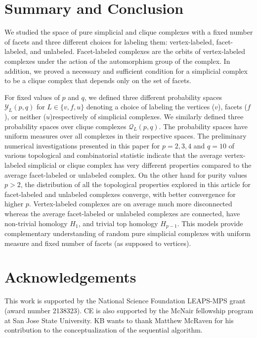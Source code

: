 \documentclass[12pt]{article}
\theoremstyle{plain}
\theoremstyle{definition}
\theoremstyle{remark}
\begin{document}

\section{Summary and Conclusion}
\label{sec:conclusion}
We studied the space of pure simplicial and clique complexes with a fixed number of facets and three different choices for labeling them: vertex-labeled, facet-labeled, and unlabeled. Facet-labeled complexes are the orbits of vertex-labeled complexes under the action of the automorphism group of the complex. In addition, we proved a necessary and sufficient condition for a simplicial complex to be a clique complex that depends only on the set of facets. 

For fixed values of $p$ and $q$, we  defined three different probability spaces $\mathcal{Y}_L(p,q)$ for $L\in\{v,f,u\}$ denoting a choice of labeling the vertices ($v$), facets ($f$), or neither ($u$)respectively of simplicial complexes. We similarly defined three probability spaces over clique complexes $\mathcal{Q}_L(p,q)$. The probability spaces have uniform measures over all complexes in their respective spaces. The preliminary numerical investigations presented in this paper for $p=2,3,4$ and $q=10$ of various topological and combinatorial statistic indicate that the average vertex-labeled simplicial or clique complex has very different properties compared to the average facet-labeled or unlabeled complex. On the other hand for purity values $p>2$, the distribution of all the topological properties explored in this article for facet-labeled and unlabeled complexes converge, with better convergence for higher $p$. Vertex-labeled complexes are on average much more disconnected whereas the average facet-labeled or unlabeled complexes are connected, have non-trivial homology $H_1$, and trivial top homology $H_{p-1}$. This models provide complementary understanding of random pure simplicial complexes with uniform measure and fixed number of facets (as supposed to vertices). 

\section*{Acknowledgements}
This work is supported by the National Science Foundation LEAPS-MPS grant (award number 2138323). CE is also supported by the McNair fellowship program at San Jose State University.  KB wants to thank Matthew McRaven for his contribution to the conceptualization of the sequential algorithm.
\end{document}
